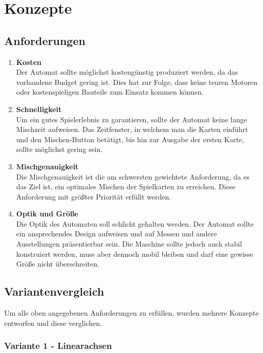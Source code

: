 \section{Konzepte}

\subsection{Anforderungen}

\begin{enumerate}
    \item \textbf{Kosten}  \\
    Der Automat sollte möglichst kostengünstig produziert werden,
    da das vorhandene Budget gering ist. Dies hat zur Folge, dass keine teuren Motoren
    oder kostenspieligen Bauteile zum Einsatz kommen können.
    \item \textbf{Schnelligkeit} \\
    Um ein gutes Spielerlebnis zu garantieren, sollte der Automat keine
    lange Mischzeit aufweisen. Das Zeitfenster, in welchem man die Karten einführt und den
    Mischen-Button betätigt, bis hin zur Ausgabe der ersten Karte, sollte möglichst gering sein.
    \item \textbf{Mischgenauigkeit} \\
    Die Mischgenauigkeit ist die am schwersten gewichtete Anforderung,
    da es das Ziel ist, ein optimales Mischen der Spielkarten zu erreichen.
    Diese Anforderung mit größter Priorität erfüllt werden.
    \item \textbf{Optik und Größe} \\
    Die Optik des Automaten soll schlicht gehalten werden. Der Automat sollte ein ansprechendes Design aufweisen und
    auf Messen und andere Ausstellungen präsentierbar sein. Die Maschine
    sollte jedoch auch stabil konstruiert werden, muss aber dennoch mobil bleiben und
    darf eine gewisse Größe nicht überschreiten.
\end{enumerate}

\subsection{Variantenvergleich}
Um alle oben angegebenen Anforderungen zu erfüllen, wurden mehrere Konzepte entworfen und diese verglichen.

\subsubsection{Variante 1 - Linearachsen}



